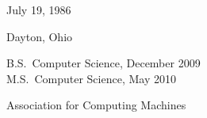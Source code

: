%
%
%
\begin{center}
{\large\thesisauthor}
\end{center}
%
%
\newcommand{\vitalabel}[1]%
  {\raisebox{0pt}[1ex][0pt]
    {\makebox[\labelwidth][l]%
      {\parbox[t]{\labelwidth}{\hspace{0pt}\textbf{#1}}}}}
%
%
\begin{list}
  {}%
  { \renewcommand{\makelabel}{\vitalabel}%
    \setlength{\labelwidth}{100pt}%
    \setlength{\leftmargin}{120pt}%
    \setlength{\itemindent}{0pt}%
    \setlength{\parsep}{\baselineskip}%
    \setlength{\itemsep}{5pt}%
    }
\item[Date of Birth] July 19, 1986
\item[Place of Birth] Dayton, Ohio
\item[Degrees] B.S.\ Computer Science, December 2009 \\
	M.S.\ Computer Science, May 2010
\item[Professional\linebreak Societies]
  Association for Computing Machines
%   
\end{list}
\flushright
\thesismonth\ \thesisyear

